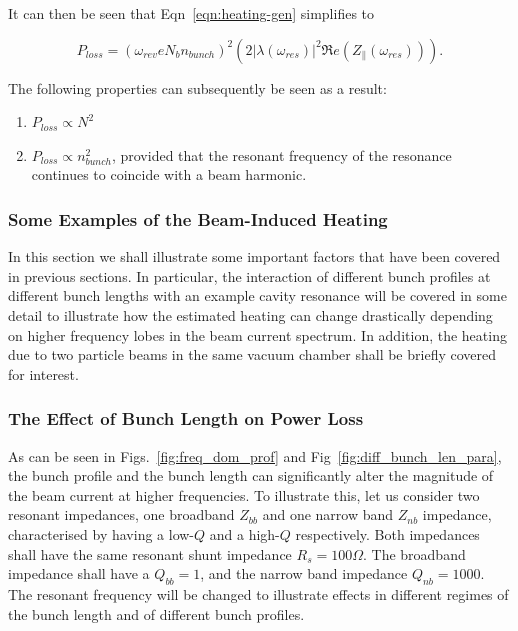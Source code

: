 It can then be seen that Eqn~\ref{eqn:heating-gen} simplifies to

\begin{equation}
P_{loss} = \left( \omega_{rev}eN_{b}n_{bunch}  \right)^{2}  \left( 2 \left| \lambda \left( \omega_{res} \right)  \right|^{2}  \Re{}e \left( Z_{\parallel} \left(\omega_{res} \right) \right) \right). 
\label{eqn:heating-high-q}
\end{equation}

The following properties can subsequently be seen as a result:

\begin{enumerate}
\item{$P_{loss} \propto N^{2}$}
\item{$P_{loss} \propto n_{bunch}^{2}$, provided that the resonant frequency of the resonance continues to coincide with a beam harmonic.}
\end{enumerate}

\subsubsection{Some Examples of the Beam-Induced Heating}

In this section we shall illustrate some important factors that have been covered in previous sections. In particular, the interaction of different bunch profiles at different bunch lengths with an example cavity resonance will be covered in some detail to illustrate how the estimated heating can change drastically depending on higher frequency lobes in the beam current spectrum. In addition, the heating due to two particle beams in the same vacuum chamber shall be briefly covered for interest.

\subsubsection{The Effect of Bunch Length on Power Loss}

As can be seen in Figs.~\ref{fig:freq_dom_prof} and Fig~\ref{fig:diff_bunch_len_para}, the bunch profile and the bunch length can significantly alter the magnitude of the beam current at higher frequencies. To illustrate this, let us consider two resonant impedances, one broadband $Z_{bb}$ and one narrow band $Z_{nb}$ impedance, characterised by having a low-$Q$ and a high-$Q$ respectively. Both impedances shall have the same resonant shunt impedance $R_{s} = 100\Omega$. The broadband impedance shall have a $Q_{bb}=1$, and the narrow band impedance $Q_{nb}=1000$. The resonant frequency will be changed to illustrate effects in different regimes of the bunch length and of different bunch profiles.

